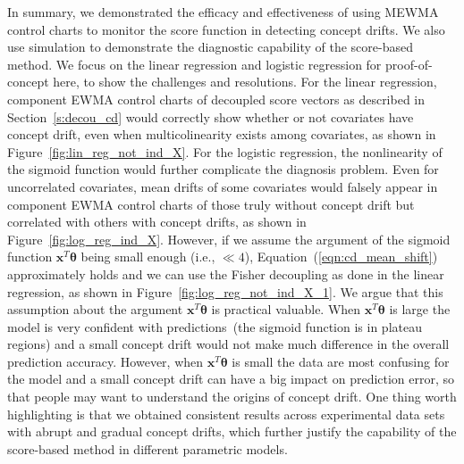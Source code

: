 \documentclass[twoside,11pt]{article}
\begin{document}
\begin{appendices}
In summary, we demonstrated the efficacy and effectiveness of using MEWMA control charts to monitor the score function in detecting concept drifts. We also use simulation to demonstrate the diagnostic capability of the score-based method. We focus on the linear regression and logistic regression for proof-of-concept here, to show the challenges and resolutions. For the linear regression, component EWMA control charts of decoupled score vectors as described in Section~\ref{s:decou_cd} would correctly show whether or not covariates have concept drift, even when multicolinearity exists among covariates, as shown in Figure~\ref{fig:lin_reg_not_ind_X}. For the logistic regression, the nonlinearity of the sigmoid function would further complicate the diagnosis problem. Even for uncorrelated covariates, mean drifts of some covariates would falsely appear in component EWMA control charts of those truly without concept drift but correlated with others with concept drifts, as shown in Figure~\ref{fig:log_reg_ind_X}. However, if we assume the argument of the sigmoid function $\bm{x}^T\bm{\theta}$ being small enough (i.e., $\ll 4$), Equation~(\ref{eqn:cd_mean_shift}) approximately holds and we can use the Fisher decoupling as done in the linear regression, as shown in Figure~\ref{fig:log_reg_not_ind_X_1}. We argue that this assumption about the argument $\bm{x}^T\bm{\theta}$ is practical valuable. When $\bm{x}^T\bm{\theta}$ is large the model is very confident with predictions~(the sigmoid function is in plateau regions) and a small concept drift would not make much difference in the overall prediction accuracy. However, when $\bm{x}^T\bm{\theta}$ is small the data are most confusing for the model and a small concept drift can have a big impact on prediction error, so that people may want to understand the origins of concept drift. One thing worth highlighting is that we obtained consistent results across experimental data sets with abrupt and gradual concept drifts, which further justify the capability of the score-based method in different parametric models.

\end{appendices}

\end{document}
